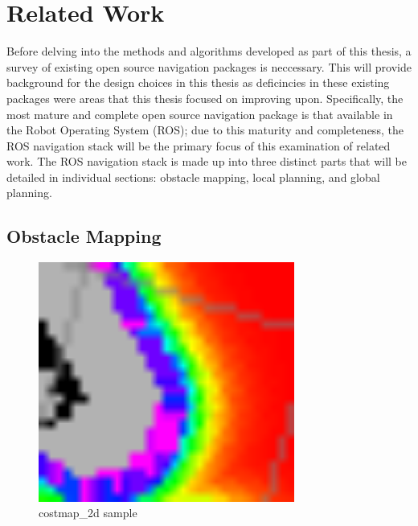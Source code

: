 \section{Related Work}\label{sec:related_work}

Before delving into the methods and algorithms developed as part of this thesis, a survey of existing open source navigation packages is neccessary. This will provide background for the design choices in this thesis as deficincies in these existing packages were areas that this thesis focused on improving upon. Specifically, the most mature and complete open source navigation package is that available in the Robot Operating System (ROS)\autocite{Marder-Eppstein2010}; due to this maturity and completeness, the ROS navigation stack will be the primary focus of this examination of related work. The ROS navigation stack is made up into three distinct parts that will be detailed in individual sections: obstacle mapping, local planning, and global planning.

\subsection{Obstacle Mapping}\label{subsec:costmap_2d}

\begin{figure}
\centering
\includegraphics[width=0.75\textwidth]{images/costmap_2d_costgradient}
\caption{costmap\_2d sample \label{fig:costmap_2d_costgradient}}
\end{figure}


